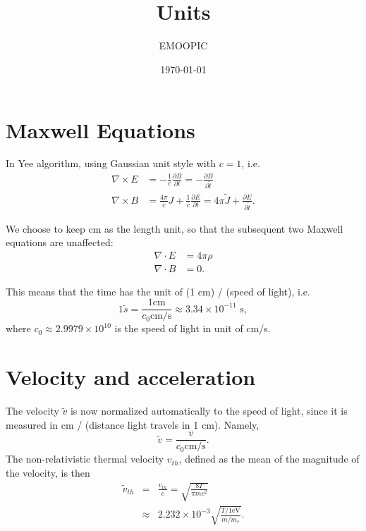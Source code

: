 \documentclass[paper=a4, fontsize=11pt]{scrartcl} %
\title{	
\horrule{0.5pt} \\[0.2cm] %
\huge Units \\[-0.2cm] %
\horrule{2pt} %
}
\author{EMOOPIC} %
\date{\normalsize\today} %
\numberwithin{equation}{section} %
\numberwithin{figure}{section} %
\numberwithin{table}{section} %
\begin{document}
\maketitle %


\section*{Maxwell Equations}

In Yee algorithm, using Gaussian unit style with $c = 1$, i.e.
\begin{align}
	\nabla \times E &= -\frac{1}{c} \frac{\partial B}{\partial t} = -\frac{\partial B}{\partial \tilde{t}}\\
	\nabla \times B &= \frac{4 \pi}{c} J + \frac{1}{c} \frac{\partial E}{\partial t} = 4 \pi \tilde{J} + \frac{\partial E}{\partial \tilde{t}}.
\end{align}

We choose to keep cm as the length unit, so that the subsequent two Maxwell equations are unaffected:
\begin{align}
	\nabla \cdot E &= 4 \pi \rho \\
	\nabla \cdot B &= 0.
\end{align}

This means that the time has the unit of (1 cm) / (speed of light), i.e.
\begin{equation}
	1 \tilde{s} = \frac{1 \text{cm}}{c_0 \text{cm/s}} \approx 3.34 \times 10^{-11} \text{ s},
\end{equation}
where $c_0 \approx 2.9979\times 10^{10}$ is the speed of light in unit of cm/s.

\section*{Velocity and acceleration}

The velocity $\tilde{v}$ is now normalized automatically to the speed of light, since it is measured in cm / (distance light travels in 1 cm). Namely,
\begin{equation}
	\tilde{v}=\frac{v}{c_0 \text{cm/s}}.
\end{equation}
The non-relativistic thermal velocity $v_{th}$, defined as the mean of the magnitude of the velocity, is then
\begin{eqnarray}
	\tilde{v}_{th}&=&\frac{v_{th}}{c}=\sqrt{\frac{8T}{\pi mc^2}}\\
         &\approx&2.232\times 10^{-3}\sqrt{\frac{T/1 \text{eV}}{m/m_e}}.
\end{eqnarray}
\end{document}
